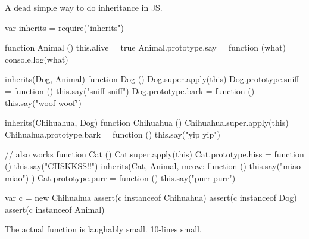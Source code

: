 A dead simple way to do inheritance in J\+S. \begin{DoxyVerb}var inherits = require("inherits")

function Animal () {
  this.alive = true
}
Animal.prototype.say = function (what) {
  console.log(what)
}

inherits(Dog, Animal)
function Dog () {
  Dog.super.apply(this)
}
Dog.prototype.sniff = function () {
  this.say("sniff sniff")
}
Dog.prototype.bark = function () {
  this.say("woof woof")
}

inherits(Chihuahua, Dog)
function Chihuahua () {
  Chihuahua.super.apply(this)
}
Chihuahua.prototype.bark = function () {
  this.say("yip yip")
}

// also works
function Cat () {
  Cat.super.apply(this)
}
Cat.prototype.hiss = function () {
  this.say("CHSKKSS!!")
}
inherits(Cat, Animal, {
  meow: function () { this.say("miao miao") }
})
Cat.prototype.purr = function () {
  this.say("purr purr")
}


var c = new Chihuahua
assert(c instanceof Chihuahua)
assert(c instanceof Dog)
assert(c instanceof Animal)
\end{DoxyVerb}


The actual function is laughably small. 10-\/lines small. 
